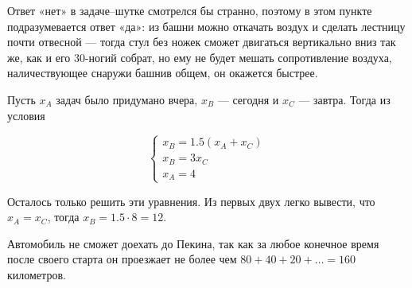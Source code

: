 
\begin{itemize}
\itA Ответ «нет» в задаче–шутке смотрелся бы странно, поэтому в этом пункте подразумевается ответ «да»: из башни можно откачать воздух и сделать лестницу почти отвесной — тогда стул без ножек сможет двигаться вертикально вниз так же, как и его 30-ногий собрат, но ему не будет мешать сопротивление воздуха, наличествующее снаружи башни\scolon в общем, он окажется быстрее.

\itB Пусть $x_A$ задач было придумано вчера, $x_B$ — сегодня и $x_C$ — завтра. Тогда из условия

$$
\begin{cases}
	x_B = 1.5(x_A+x_C) \\
	x_B = 3x_C \\
	x_A = 4
\end{cases}
$$

Осталось только решить эти уравнения. Из первых двух легко вывести, что $x_A = x_C$, тогда $x_B = 1.5 \cdot 8 = 12$.

\itC Автомобиль не сможет доехать до Пекина, так как за любое конечное время после своего старта он проезжает не более чем $80+40+20+\ldots=160$ километров.
\end{itemize}